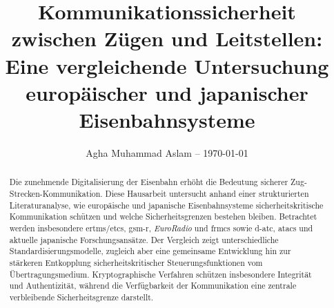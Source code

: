 \documentclass[runningheads]{res/llncs}
\begin{document}
\newcommand{\cmt}[1]{}
\glsunsetall


\title{Kommunikationssicherheit zwischen Zügen und Leitstellen: Eine vergleichende Untersuchung europäischer und japanischer Eisenbahnsysteme}


\author{Agha Muhammad Aslam -- \today}



\maketitle

\begin{abstract}
Die zunehmende Digitalisierung der Eisenbahn erhöht die Bedeutung sicherer Zug-Strecken-Kommunikation. Diese Hausarbeit untersucht anhand einer strukturierten Literaturanalyse, wie europäische und japanische Eisenbahnsysteme sicherheitskritische Kommunikation schützen und welche Sicherheitsgrenzen bestehen bleiben. Betrachtet werden insbesondere \gls{ertms}/\gls{etcs}, \gls{gsm-r}, \textit{EuroRadio} und \gls{frmcs} sowie \gls{d-atc}, \gls{atacs} und aktuelle japanische Forschungsansätze. Der Vergleich zeigt unterschiedliche Standardisierungsmodelle, zugleich aber eine gemeinsame Entwicklung hin zur stärkeren Entkopplung sicherheitskritischer Steuerungsfunktionen vom Übertragungsmedium. Kryptographische Verfahren schützen insbesondere Integrität und Authentizität, während die Verfügbarkeit der Kommunikation eine zentrale verbleibende Sicherheitsgrenze darstellt.

\end{abstract}
\end{document}
